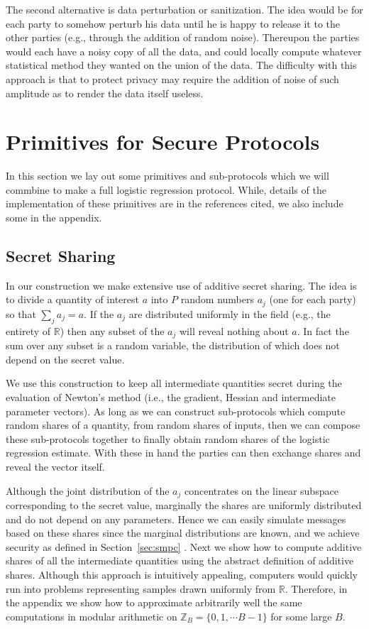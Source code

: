 \documentclass[11pt]{article}
\begin{document}
The second alternative is data perturbation or sanitization.  The idea would be for each party to somehow perturb his data until he is happy to release it to the other parties (e.g., through the addition of random noise).  Thereupon the parties would each have a noisy copy of all the data, and could locally compute whatever statistical method they wanted on the union of the data.  The difficulty with this approach is that to protect privacy may require the addition of noise of such amplitude as to render the data itself useless.


\section{Primitives for Secure Protocols}\label{sec:blocks}

In this section we lay out some primitives and  sub-protocols which we will commbine to make a full logistic regression protocol.  While, details of the implementation of these primitives are  in the references cited, we also include some  in the appendix.

\subsection{Secret Sharing}
In our construction we  make extensive use of additive secret sharing.  The idea is to divide a quantity of interest $a$ into $P$ random numbers $a_j$ (one for each party) so that $\sum_ja_j = a$.  If the $a_j$ are distributed uniformly in the field (e.g., the entirety of $\mathbb{R}$) then any subset of the $a_j$ will reveal nothing about $a$.  In fact the sum over any subset is a random variable, the distribution of which does not depend on the secret value.

We use this construction to keep all intermediate quantities secret during the evaluation of Newton's method (i.e., the gradient, Hessian and intermediate parameter vectors).  As long as we can construct sub-protocols which compute random shares of a quantity, from random shares of inputs, then we can compose these sub-protocols together to finally obtain random shares of the logistic regression estimate.  With these in hand the parties can then exchange shares and reveal the vector itself.

Although the joint distribution of the $a_j$ concentrates on the linear subspace corresponding to the secret value, marginally the shares are uniformly distributed and do not  depend on any parameters.  Hence we can easily simulate messages based on these shares since the marginal distributions are known, and  we achieve security as defined in Section~\ref{sec:smpc} .  Next we show how to compute additive shares of all the intermediate quantities using the abstract definition of additive shares.  Although this approach is intuitively appealing, computers would quickly run into problems representing samples drawn uniformly from $\mathbb{R}$.  Therefore, in the appendix we show how to approximate arbitrarily well the same computations in modular arithmetic on $\mathbb{Z}_B = \{0,1,\cdots B-1\}$ for some large $B$.
\end{document}
